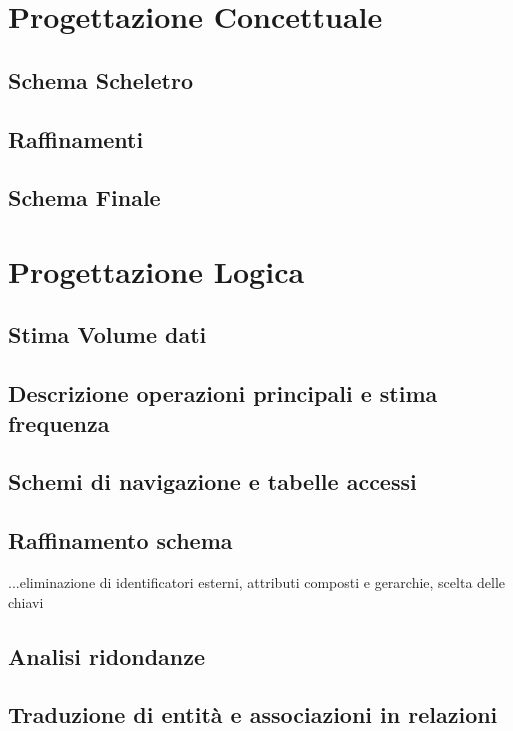 \documentclass[a4paper,12pt]{report}
\begin{document}
\chapter{Progettazione Concettuale}

\section{Schema Scheletro}

\section{Raffinamenti}

\section{Schema Finale}

\chapter{Progettazione Logica}

\section{Stima Volume dati}

\section{Descrizione operazioni principali e stima frequenza}

\section{Schemi di navigazione e tabelle accessi}

\section{Raffinamento schema}
...eliminazione di identificatori esterni, attributi composti e gerarchie, scelta delle chiavi

\section{Analisi ridondanze}

\section{Traduzione di entità e associazioni in relazioni}
\end{document}
